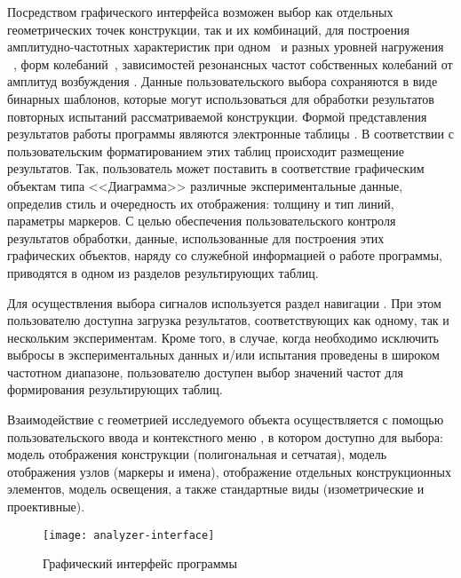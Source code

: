 Посредством графического интерфейса  возможен выбор как отдельных геометрических точек конструкции, так и их комбинаций, для построения амплитудно-частотных характеристик при одном~ и разных уровней нагружения ~, форм колебаний~, зависимостей резонансных частот собственных колебаний от амплитуд возбуждения . Данные пользовательского выбора сохраняются в виде бинарных шаблонов, которые могут использоваться для обработки результатов повторных испытаний рассматриваемой конструкции. Формой представления результатов работы программы являются электронные таблицы . В соответствии с пользовательским форматированием этих таблиц происходит размещение результатов. Так, пользователь может поставить в соответствие графическим объектам типа <<Диаграмма>> различные экспериментальные данные, определив стиль и очередность их отображения: толщину и тип линий, параметры маркеров. С целью обеспечения пользовательского контроля результатов обработки, данные, использованные для построения этих графических объектов, наряду со служебной информацией о работе программы, приводятся в одном из разделов результирующих таблиц.

Для осуществления выбора сигналов используется раздел навигации  . При этом пользователю доступна загрузка результатов, соответствующих как одному, так и нескольким экспериментам. Кроме того, в случае, когда необходимо исключить выбросы в экспериментальных данных и/или испытания проведены в широком частотном диапазоне, пользователю доступен выбор значений частот для формирования результирующих таблиц.

Взаимодействие с геометрией исследуемого объекта осуществляется с помощью пользовательского ввода и контекстного меню , в котором доступно для выбора: модель отображения конструкции (полигональная и сетчатая), модель отображения узлов (маркеры и имена), отображение отдельных конструкционных элементов, модель освещения, а также стандартные виды (изометрические и проективные).

\begin{figure}[H]
	\centerfloat
	\texttt{[image: analyzer-interface]}
	\caption{Графический интерфейс программы} \label{fig:analyzer-interface}
\end{figure}

